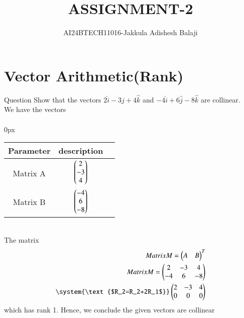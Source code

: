 \documentclass[journal]{IEEEtran}
\begin{document}

\renewcommand{\thefigure}{\theenumi}
\renewcommand{\thetable}{\theenumi}
\setlength{\intextsep}{10pt} %
\renewcommand{\thetable}{\theenumi}
\title{ASSIGNMENT-2}
\author{AI24BTECH11016-Jakkula Adishesh Balaji}
\maketitle
\bigskip
\section*{\textbf{Vector Arithmetic(Rank)}}

         Question Show that the vectors $2\hat{i}-3\hat{j}+4\hat{k}$ and $-4\hat{i}+6\hat{j}-8\hat{k}$ are collinear.\\
         \solution We have the vectors \\ \\
         \centering
         \parindent 0px
\begin{tabular}{|c|c|c|}
    \hline
    Parameter & description \\
    \hline
    Matrix A & $\begin{pmatrix}2\\-3\\4\end{pmatrix}$ \\
    \hline
    Matrix B & $\begin{pmatrix}-4\\6\\-8\end{pmatrix}$ \\
    \hline
\end{tabular}
\\
         The matrix 
         \centering
         \begin{align*}
         Matrix M={\myvec{A&B}}^{T} \\
         Matrix M=\myvec{2&-3&4\\-4&6&-8} \\
         \system{\text{$R_2=R_2+2R_1$}}
         \myvec{2&-3&4\\0&0&0}\\
         \end{align*}
         which has rank 1. Hence, we conclude the given vectors are collinear
\end{document}
